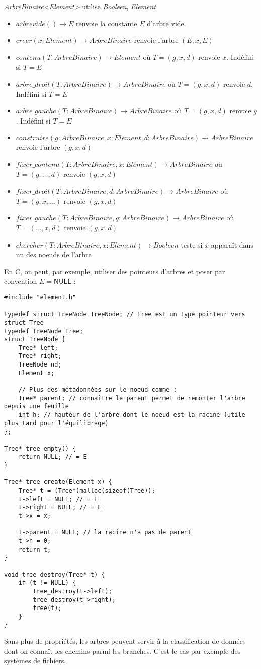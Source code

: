 \documentclass[../../../main.tex]{subfiles}
\begin{document}
\textit{ArbreBinaire\textless{}Element\textgreater} utilise \textit{Booleen}, \textit{Element}
\begin{itemize}
	\item $arbrevide()\rightarrow E$ renvoie la constante $E$ d'arbre vide.
	\item $creer(x:Element) \rightarrow ArbreBinaire$ renvoie l'arbre $(E, x, E)$
	\item $contenu(T:ArbreBinaire)\rightarrow Element$ où $T = (g, x, d)$ renvoie $x$. Indéfini si $T = E$
	\item $arbre\_droit(T:ArbreBinaire)\rightarrow ArbreBinaire$ où $T = (g, x, d)$ renvoie $d$. Indéfini si $T = E$
	\item $arbre\_gauche(T:ArbreBinaire)\rightarrow ArbreBinaire$ où $T = (g, x, d)$ renvoie $g$. Indéfini si $T = E$
	\item $construire(g:ArbreBinaire, x:Element, d:ArbreBinaire)\rightarrow ArbreBinaire$ renvoie l'arbre $(g, x, d)$
	\item $fixer\_contenu(T:ArbreBinaire, x:Element)\rightarrow ArbreBinaire$ où $T = (g, \dots, d)$ renvoie $(g, x, d)$
	\item $fixer\_droit(T:ArbreBinaire, d:ArbreBinaire)\rightarrow ArbreBinaire$ où $T = (g, x, \dots)$ renvoie $(g, x, d)$
	\item $fixer\_gauche(T:ArbreBinaire, g:ArbreBinaire)\rightarrow ArbreBinaire$ où $T = (\dots, x, d)$ renvoie $(g, x, d)$
	\item $chercher(T:ArbreBinaire, x:Element)\rightarrow Booleen$ teste si $x$ apparaît dans un des noeuds de l'arbre
\end{itemize}
En C, on peut, par exemple, utiliser des pointeurs d'arbres et poser par convention $E = \textsf{NULL}$ :
\begin{verbatim}
#include "element.h"

typedef struct TreeNode TreeNode; // Tree est un type pointeur vers struct Tree
typedef TreeNode Tree;
struct TreeNode {
	Tree* left;
	Tree* right;
	TreeNode nd;
	Element x;

	// Plus des métadonnées sur le noeud comme :
	Tree* parent; // connaître le parent permet de remonter l'arbre depuis une feuille
	int h; // hauteur de l'arbre dont le noeud est la racine (utile plus tard pour l'équilibrage)
};

Tree* tree_empty() {
	return NULL; // = E
}

Tree* tree_create(Element x) {
	Tree* t = (Tree*)malloc(sizeof(Tree));
	t->left = NULL; // = E
	t->right = NULL; // = E
	t->x = x;

	t->parent = NULL; // la racine n'a pas de parent
	t->h = 0;
	return t;
}

void tree_destroy(Tree* t) {
	if (t != NULL) {
		tree_destroy(t->left);
		tree_destroy(t->right);
		free(t);
	}
}
\end{verbatim}
Sans plus de propriétés, les arbres peuvent servir à la classification de données dont on connaît les chemins parmi les branches. C'est-le cas par exemple des systèmes de fichiers.
\end{document}
